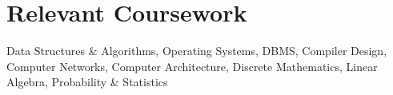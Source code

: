 \documentclass[a4paper,11pt]{article}
\begin{document}
\section{Relevant Coursework}
\begin{itemize}[leftmargin=0.15in, label={}]
\small{\item{Data Structures \& Algorithms, Operating Systems, DBMS, Compiler Design, Computer Networks, Computer Architecture, Discrete Mathematics, Linear Algebra, Probability \& Statistics}}
\end{itemize}
\end{document}
